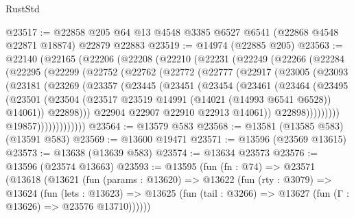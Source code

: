 \begin{lexlean}{RustStd}
\begin{coremodule}
@23517 := @22858 @205 @64 @13 @4548 @3385 @6527 @6541 (@22868 @4548 @22871 @18874) @22879 @22883
@23519 := @14974 (@22885 @205)
@23563 := @22140
    (@22165
      (@22206
        (@22208
          (@22210
            (@22231
              (@22249
                (@22266
                  (@22284
                    (@22295
                      (@22299
                        (@22752
                          (@22762
                            (@22772
                              (@22777
                                (@22917
                                  (@23005
                                    (@23093
                                      (@23181
                                        (@23269
                                          (@23357
                                            (@23445
                                              (@23451
                                                (@23454
                                                  (@23461
                                                    (@23464
                                                      (@23495
                                                        (@23501
                                                          (@23504
                                                            (@23517
                                                              @23519
                                                              @14991
                                                              (@14021 (@14993 @6541 @6528))
                                                              @14061))
                                                          @22898)))
                                                    @22904
                                                    @22907
                                                    @22910
                                                    @22913
                                                    @14061))
                                                @22898)))))))))
                              @19857)))))))))))))
@23564 := @13579 @583
@23568 := @13581 (@13585 @583) (@13591 @583)
@23569 := @13600 @19471
@23571 := @13596 (@23569 @13615)
@23573 := @13638 (@13639 @583)
@23574 := @13634 @23573
@23576 := @13596 (@23574 @13663)
@23593 := @13595
    (fun (fn : @74) =>
    @23571
      (@13618
        (@13621
          (fun (params : @13620) =>
          @13622
            (fun (rty : @3079) =>
            @13624
              (fun (lets : @13623) =>
              @13625 (fun (tail : @3266) => @13627 (fun (Γ : @13626) => @23576 @13710))))))

\end{coremodule}
\end{lexlean}
